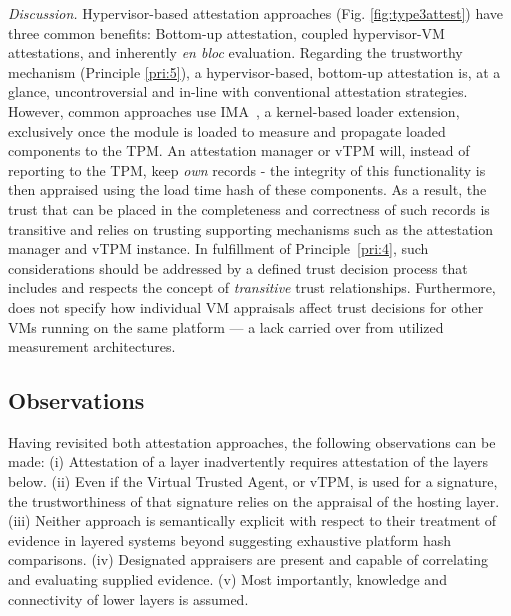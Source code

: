 \emph{Discussion. }Hypervisor-based attestation approaches (Fig. \ref{fig:type3attest}) have three common benefits: Bottom-up attestation, coupled hypervisor-VM attestations, and inherently \emph{en bloc} evaluation. Regarding the trustworthy mechanism (Principle \ref{pri:5}), a hypervisor-based, bottom-up attestation is, at a glance, uncontroversial and in-line with conventional attestation strategies. However, common approaches use IMA~\cite{IMA}, a kernel-based loader extension, exclusively once the module is loaded to measure and propagate loaded components to the TPM. An attestation manager or vTPM will, instead of reporting to the TPM, keep \emph{own} records - the integrity of this functionality is then appraised using the load time hash of these components. As a result, the trust that can be placed in the completeness and correctness of such records is transitive and relies on trusting supporting mechanisms such as the attestation manager and vTPM instance. In fulfillment of Principle~\ref{pri:4}, such considerations should be addressed by a defined trust decision process that includes and respects the concept of \emph{transitive} trust relationships. Furthermore, \cite{lauer2016} does not specify how individual VM appraisals affect trust decisions for other VMs running on the same platform --- a lack carried over from utilized measurement architectures.

\subsection{Observations}\label{subsec:observations}
Having revisited both attestation approaches, the following observations can be made: (i) Attestation of a layer inadvertently requires attestation of the layers below. (ii) Even if the Virtual Trusted Agent, or vTPM, is used for a signature, the trustworthiness of that signature relies on the appraisal of the hosting layer. (iii) Neither approach is semantically explicit with respect to their treatment of evidence in layered systems beyond suggesting exhaustive platform hash comparisons. (iv) Designated appraisers are present and capable of correlating and evaluating supplied evidence. (v) Most importantly, knowledge and connectivity of lower layers is assumed. 


